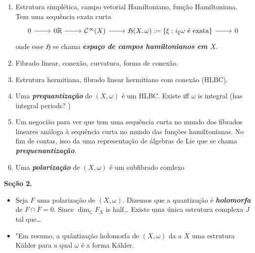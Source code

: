 \begin{enumerate}
	\item Estrutura simplética, campo vetorial Hamiltoniano, função Hamiltoniana. Tem uma sequência exata curta 
		\[\begin{tikzcd}
			0\arrow[r]&0\mathbb{R}\arrow[r]&\mathcal{C}^\infty(X)\arrow[r]&\mathfrak{H}(X,\omega):=\{\xi:i_\xi\omega\text{ é exata} \}\arrow[r]&0
		\end{tikzcd}\]
onde esse $\mathfrak{H}$ se chama \textit{\textbf{espaço de campos hamiltonianos em $X$}}.
	\item Fibrado linear, conexão, curvatura, forma de conexão.
	\item Estrutura hermitiana, fibrado linear hermitiano com conexão (HLBC).
	\item Uma \textit{\textbf{prequantização}} de $(X,\omega)$ é um HLBC. Existe iff $\omega$ is integral (has integral periods? )
	\item Um negocião para ver que tem uma sequência curta no mundo dos fibrados lineares análoga à sequência curta no mundo das funções hamiltonianas. No fim de contas, isso da uma representação de álgebras de Lie que se chama \textit{\textbf{prequenantização}}.

	 \item Uma \textit{\textbf{polarização}} de $(X,\omega)$ é um subfibrado comlexo
\end{enumerate}

{\color{4}\bfseries Seção 2.}\hspace{.5em}
\begin{itemize}
	\item Seja $F$ uma polarização de $(X,\omega)$. Dizemos que a quantização é \textit{\textbf{holomorfa}} de  $F\cap \overline{F}=0$. Since $\dim_\mathbb{C}F_X$ is half… Existe uma única estrutura complexa $J$ tal que…
\item "Em resumo, a quântização holomorfa de $(X,\omega)$ da a $X$ uma estrutura Kähler para a qual $\omega$ é a forma Kähler.
\end{itemize}


